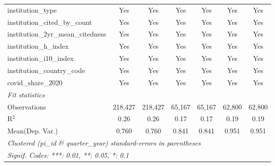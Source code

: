 \begin{tabular}{lcccccc}
   institution\_type                                           & Yes            & Yes            & Yes            & Yes            & Yes            & Yes\\  
   institution\_cited\_by\_count                               & Yes            & Yes            & Yes            & Yes            & Yes            & Yes\\  
   institution\_2yr\_mean\_citedness                           & Yes            & Yes            & Yes            & Yes            & Yes            & Yes\\  
   institution\_h\_index                                       & Yes            & Yes            & Yes            & Yes            & Yes            & Yes\\  
   institution\_i10\_index                                     & Yes            & Yes            & Yes            & Yes            & Yes            & Yes\\  
   institution\_country\_code                                  & Yes            & Yes            & Yes            & Yes            & Yes            & Yes\\  
   covid\_share\_2020                                          & Yes            & Yes            & Yes            & Yes            & Yes            & Yes\\  
   \midrule
   \emph{Fit statistics}\\
   Observations                                                & 218,427        & 218,427        & 65,167         & 65,167         & 62,800         & 62,800\\  
   R$^2$                                                       & 0.26           & 0.26           & 0.17           & 0.17           & 0.19           & 0.19\\  
Mean(Dep. Var.) & 0.760 & 0.760 & 0.841 & 0.841 & 0.951 & 0.951 \\
   \midrule \midrule
   \multicolumn{7}{l}{\emph{Clustered (pi\_id \& quarter\_year) standard-errors in parentheses}}\\
   \multicolumn{7}{l}{\emph{Signif. Codes: ***: 0.01, **: 0.05, *: 0.1}}\\
\end{tabular}
\par\endgroup
